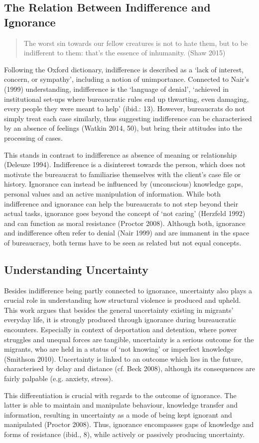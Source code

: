 \subsection{The Relation Between Indifference and Ignorance}
    \blockquote{The worst sin towards our fellow creatures is not to hate them, but to be indifferent to them: that's the essence of inhumanity. (Shaw 2015)}
\noindent Following the Oxford dictionary, indifference is described as a ‘lack of interest, concern, or sympathy’, including a notion of unimportance. Connected to Nair’s (1999) understanding, indifference is the ‘language of denial’, ‘achieved in institutional set-ups where bureaucratic rules end up thwarting, even damaging, every people they were meant to help’ (ibid.: 13). However, bureaucrats do not simply treat each case similarly, thus suggesting indifference can be characterised by an absence of feelings (Watkin 2014, 50), but bring their attitudes into the processing of cases.
\par
This stands in contrast to indifference as absence of meaning or relationship (Deleuze 1994). Indifference is a disinterest towards the person, which does not motivate the bureaucrat to familiarise themselves with the client’s case file or history. Ignorance can instead be influenced by (unconscious) knowledge gaps, personal values and an active manipulation of information. While both indifference and ignorance can help the bureaucrats to not step beyond their actual tasks, ignorance goes beyond the concept of ‘not caring’ (Herzfeld 1992) and can function as moral resistance (Proctor 2008). Although both, ignorance and indifference often refer to denial (Nair 1999) and are immanent in the space of bureaucracy, both terms have to be seen as related but not equal concepts. 

\subsection{Understanding Uncertainty}

Besides indifference being partly connected to ignorance, uncertainty also plays a crucial role in understanding how structural violence is produced and upheld. This work argues that besides the general uncertainty existing in migrants’ everyday life, it is strongly produced through ignorance during bureaucratic encounters. Especially in context of deportation and detention, where power struggles and unequal forces are tangible, uncertainty is a serious outcome for the migrants, who are held in a status of ‘not knowing’ or imperfect knowledge (Smithson 2010).  Uncertainty is linked to an outcome which lies in the future, characterised by delay and distance (cf. Beck 2008), although its consequences are fairly palpable (e.g. anxiety, stress).
\par
This differentiation is crucial with regards to the outcome of ignorance. The latter is able to maintain and manipulate behaviour, knowledge transfer and information, resulting in uncertainty as a mode of being kept ignorant and manipulated (Proctor 2008). Thus, ignorance encompasses gaps of knowledge and forms of resistance (ibid., 8), while actively or passively producing uncertainty. 

